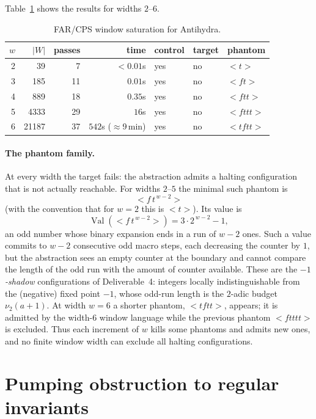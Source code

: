 \documentclass[11pt,a4paper]{article}
\theoremstyle{definition}
\newcommand{\lt}{<}
\newcommand{\gt}{>}
\newcommand{\val}{\operatorname{Val}}
\begin{document}
Table~\ref{tab:far} shows the results for widths $2$--$6$.

\begin{table}[ht]
\centering
\caption{FAR/CPS window saturation for Antihydra.}
\label{tab:far}
\begin{tabular}{rrrrlll}
\toprule
$w$ & $|W|$ & passes & time & control & target & phantom \\
\midrule
2 & 39 & 7 & $<0.01$s & yes & no & $\lt t\gt$ \\
3 & 185 & 11 & $0.01$s & yes & no & $\lt ft\gt$ \\
4 & 889 & 18 & $0.35$s & yes & no & $\lt ftt\gt$ \\
5 & 4333 & 29 & $16$s & yes & no & $\lt fttt\gt$ \\
6 & 21187 & 37 & $542$s ($\approx$9\,min) & yes & no & $\lt tftt\gt$ \\
\bottomrule
\end{tabular}
\end{table}

\paragraph{The phantom family.}
At every width the target fails: the abstraction admits a halting
configuration that is not actually reachable.  For widths $2$--$5$ the
minimal such phantom is
\[
  \lt f\,t^{\,w-2}\gt
\]
(with the convention that for $w=2$ this is $\lt t\gt$).  Its value is
\[
  \val(\lt f\,t^{\,w-2}\gt)=3\cdot2^{\,w-2}-1,
\]
an odd number whose binary expansion ends in a run of $w-2$ ones.  Such
a value commits to $w-2$ consecutive odd macro steps, each decreasing
the counter by $1$, but the abstraction sees an empty counter at the
boundary and cannot compare the length of the odd run with the amount
of counter available.  These are the \emph{$-1$-shadow} configurations
of Deliverable~4: integers locally indistinguishable from the
(negative) fixed point $-1$, whose odd-run length is the $2$-adic budget
$\nu_2(a+1)$.  At width $w=6$ a shorter phantom, $\lt tftt\gt$,
appears; it is admitted by the width-$6$ window language while the
previous phantom $\lt ftttt\gt$ is excluded.  Thus each increment of
$w$ kills some phantoms and admits new ones, and no finite window width
can exclude all halting configurations.

\section{Pumping obstruction to regular invariants}
\label{sec:obstruction}
\end{document}
